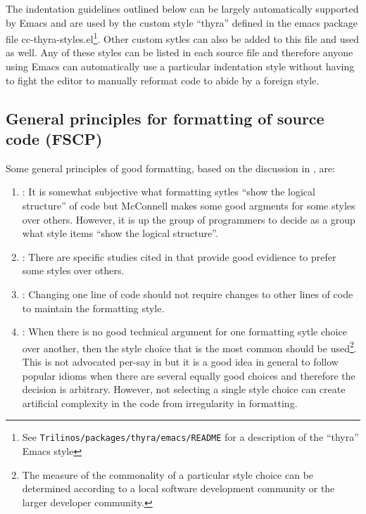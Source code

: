 The indentation guidelines outlined below can be largely automatically
supported by Emacs and are used by the custom style ``thyra'' defined in the
emacs package file cc-thyra-styles.el\footnote{See
{}\texttt{Trilinos/packages/thyra/emacs/README} for a description of the
``thyra'' Emacs style}.  Other custom sytles can also be added to this file
and used as well.  Any of these styles can be listed in each source file and
therefore anyone using Emacs can automatically use a particular indentation
style without having to fight the editor to manually reformat code to abide by
a foreign style.

%
\subsection{General principles for formatting of source code (FSCP)}
%

Some general principles of good formatting, based on the discussion in
{}\cite[Section 31.1]{CodeComplete2nd04}, are:

\begin{enumerate}

{}\item\FSCPShowLogicalStructure: It is somewhat subjective what formatting sytles
``show the logical structure'' of code but McConnell makes some good argments
for some styles over others.  However, it is up the group of programmers to
decide as a group what style items ``show the logical structure''.

{}\item\FSCPImproveReadability: There are specific studies cited in
{}\cite[Chapter 31]{CodeComplete2nd04} that provide good evidience to prefer
some styles over others.

{}\item\FSCPRetainFormatting: Changing one line of code should not require changes to
other lines of code to maintain the formatting style.

{}\item\FSCPFollowCommonIdioms: When there is no good technical argument for
one formatting sytle choice over another, then the style choice that is the
most common should be used\footnote{The measure of the commonality of a
particular style choice can be determined according to a local software
development community or the larger developer community.}.  This is not
advocated per-say in {}\cite[Chapter 31]{CodeComplete2nd04} but it is a good
idea in general to follow popular idioms when there are several equally good
choices and therefore the decision is arbitrary.  However, not selecting a
single style choice can create artificial complexity in the code from
irregularity in formatting.

\end{enumerate}


